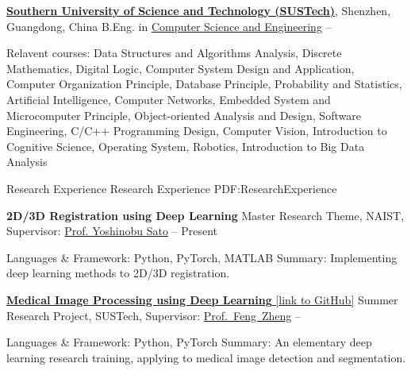 \documentclass[a4paper,MMMyyyy,nonstopmode]{simpleresumecv}
\begin{document}
\begin{Body}
    \Entry
    \href{https://www.sustech.edu.cn/}
    {\textbf{Southern University of Science and Technology (SUSTech)}},
    Shenzhen, Guangdong, China
    \Gap
    \BulletItem
    B.Eng. in
    \href{http://cse.sustech.edu.cn/}
    {Computer Science and Engineering}
    \hfill
     --
    \begin{Detail}
        \SubBulletItem
        Relavent courses:
        Data Structures and Algorithms Analysis,
        Discrete Mathematics,
        Digital Logic,
        Computer System Design and Application,
        Computer Organization Principle,
        Database Principle,
        Probability and Statistics,
        Artificial Intelligence,
        Computer Networks,
        Embedded System and Microcomputer Principle,
        Object-oriented Analysis and Design,
        Software Engineering,
        C/C++ Programming Design,
        Computer Vision,
        Introduction to Cognitive Science,
        Operating System,
        Robotics,
        Introduction to Big Data Analysis
    \end{Detail}


    \Section
    {Research Experience}
    {Research Experience}
    {PDF:ResearchExperience}

    \Entry
    \textbf{2D/3D Registration using Deep Learning}
    \BulletItem
    Master Research Theme, NAIST, Supervisor: \href{http://icb-lab.naist.jp/members/yoshi/index.html}{Prof. Yoshinobu Sato}
    \hfill
     -- Present
    \begin{Detail}
        \SubBulletItem
        Languages \& Framework: Python, PyTorch, MATLAB
        \SubBulletItem
        Summary:
        Implementing deep learning methods to 2D/3D registration.
    \end{Detail}

    \Entry
    \href{https://github.com/hackroid/cv-xmp}
    {\textbf{Medical Image Processing using Deep Learning} [link to GitHub]}
    \BulletItem
    Summer Research Project, SUSTech, Supervisor: \href{https://faculty.sustech.edu.cn/fengzheng/en/}{Prof.~Feng~Zheng}
    \hfill
     --
    \begin{Detail}
        \SubBulletItem
        Languages \& Framework: Python, PyTorch
        \SubBulletItem
        Summary:
        An elementary deep learning research training, applying to medical image detection and segmentation.
    \end{Detail}


\end{Body}
\end{document}
